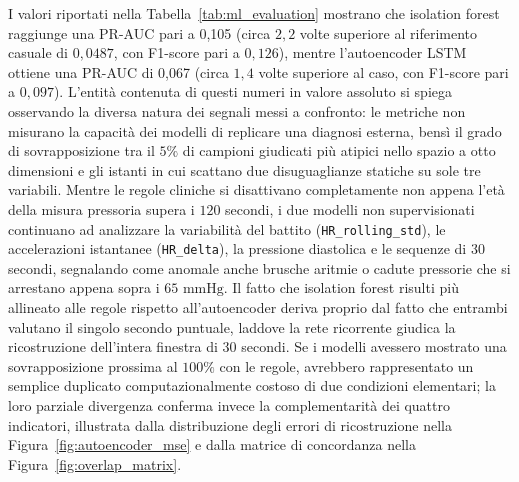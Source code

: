 \begin{table}[ht]
\centering
{}
\caption{Metriche di concordanza dei modelli non supervisionati rispetto alle regole cliniche sui 500 casi del livello gold.}
\label{tab:ml_evaluation}
\end{table}

I valori riportati nella Tabella~\ref{tab:ml_evaluation} mostrano che isolation forest raggiunge una PR-AUC pari a 0,105 (circa $2,2$ volte superiore al riferimento casuale di $0,0487$, con F1-score pari a $0,126$), mentre l'autoencoder LSTM ottiene una PR-AUC di 0,067 (circa $1,4$ volte superiore al caso, con F1-score pari a $0,097$). L'entit\`a contenuta di questi numeri in valore assoluto si spiega osservando la diversa natura dei segnali messi a confronto: le metriche non misurano la capacit\`a dei modelli di replicare una diagnosi esterna, bens\`i il grado di sovrapposizione tra il $5\%$ di campioni giudicati pi\`u atipici nello spazio a otto dimensioni e gli istanti in cui scattano due disuguaglianze statiche su sole tre variabili. Mentre le regole cliniche si disattivano completamente non appena l'et\`a della misura pressoria supera i $120$ secondi, i due modelli non supervisionati continuano ad analizzare la variabilit\`a del battito (\texttt{HR\_rolling\_std}), le accelerazioni istantanee (\texttt{HR\_delta}), la pressione diastolica e le sequenze di $30$ secondi, segnalando come anomale anche brusche aritmie o cadute pressorie che si arrestano appena sopra i $65\text{ mmHg}$. Il fatto che isolation forest risulti pi\`u allineato alle regole rispetto all'autoencoder deriva proprio dal fatto che entrambi valutano il singolo secondo puntuale, laddove la rete ricorrente giudica la ricostruzione dell'intera finestra di $30$ secondi. Se i modelli avessero mostrato una sovrapposizione prossima al $100\%$ con le regole, avrebbero rappresentato un semplice duplicato computazionalmente costoso di due condizioni elementari; la loro parziale divergenza conferma invece la complementarit\`a dei quattro indicatori, illustrata dalla distribuzione degli errori di ricostruzione nella Figura~\ref{fig:autoencoder_mse} e dalla matrice di concordanza nella Figura~\ref{fig:overlap_matrix}.

